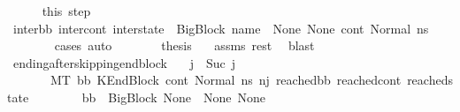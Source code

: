 \begin{isabellebody}
\ \ \ \ \isamarkupfalse%
\ this\ step{}\ \isamarkupfalse%
\ {\isachardoublequoteopen}{\isacharparenleft}{\kern0pt}inter{\isacharunderscore}{\kern0pt}bb{\isacharcomma}{\kern0pt}\ inter{\isacharunderscore}{\kern0pt}cont{\isacharcomma}{\kern0pt}\ inter{\isacharunderscore}{\kern0pt}state{\isacharparenright}{\kern0pt}\ {\isacharequal}{\kern0pt}\ {\isacharparenleft}{\kern0pt}BigBlock\ name\ {\isacharbrackleft}{\kern0pt}{\isacharbrackright}{\kern0pt}\ None\ None{\isacharcomma}{\kern0pt}\ cont{}{\isacharcomma}{\kern0pt}\ Normal\ ns{}{\isacharparenright}{\kern0pt}{\isachardoublequoteclose}\isanewline
\ \ \ \ \ \ \isamarkupfalse%
\ {\isacharparenleft}{\kern0pt}cases{\isacharparenright}{\kern0pt}\ auto\isanewline
\ \ \ \ \isamarkupfalse%
\ \isamarkupfalse%
\ {\isacharquery}{\kern0pt}thesis\ \isamarkupfalse%
\ {\isachardoublequoteopen}{}{\isachardoublequoteclose}\ assms{\isacharparenleft}{\kern0pt}{}{\isacharparenright}{\kern0pt}\ rest\ \isamarkupfalse%
\ blast\isanewline
\ \ \isamarkupfalse%
\isanewline
{}\isamarkupfalse%
%
\endisatagproof
{\isafoldproof}%
%
\isadelimproof
\isanewline
%
\endisadelimproof
\isanewline
{}\isamarkupfalse%
\ ending{\isacharunderscore}{\kern0pt}after{\isacharunderscore}{\kern0pt}skipping{\isacharunderscore}{\kern0pt}endblock{\isacharcolon}{\kern0pt}\isanewline
\ \ \ {\isachardoublequoteopen}j\ {\isacharequal}{\kern0pt}\ Suc\ j{\isacharprime}{\kern0pt}{\isachardoublequoteclose}\ \isanewline
\ \ \ \ \ \ \ {\isachardoublequoteopen}M{\isacharcomma}{\kern0pt}{\isasymLambda}{\isacharcomma}{\kern0pt}{\isasymGamma}{\isacharcomma}{\kern0pt}{\isasymOmega}{\isacharcomma}{\kern0pt}T\ {\isasymturnstile}{\isacharparenleft}{\kern0pt}bb{\isacharcomma}{\kern0pt}\ KEndBlock\ cont{}{\isacharcomma}{\kern0pt}\ Normal\ ns{}{\isacharprime}{\kern0pt}{\isacharprime}{\kern0pt}{\isacharparenright}{\kern0pt}\ {\isacharminus}{\kern0pt}n{\isasymlongrightarrow}{\isacharcircum}{\kern0pt}j{\isacharprime}{\kern0pt}\ {\isacharparenleft}{\kern0pt}reached{\isacharunderscore}{\kern0pt}bb{\isacharcomma}{\kern0pt}\ reached{\isacharunderscore}{\kern0pt}cont{\isacharcomma}{\kern0pt}\ reached{\isacharunderscore}{\kern0pt}state{\isacharparenright}{\kern0pt}{\isachardoublequoteclose}\ \isanewline
\ \ \ \ \ \ \ {\isachardoublequoteopen}bb\ {\isacharequal}{\kern0pt}\ BigBlock\ None\ {\isacharbrackleft}{\kern0pt}{\isacharbrackright}{\kern0pt}\ None\ None{\isachardoublequoteclose}\isanewline

\end{isabellebody}
